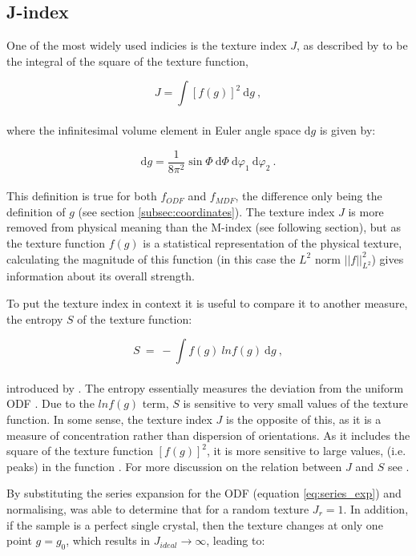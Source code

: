 \documentclass[a4paper,12pt,twoside]{report}
\numberwithin{equation}{chapter}
\begin{document}
\subsection{J-index} \label{subsec:j-index}
 One of the most widely used indicies is the texture index $J$, as described by \cite{bunge1982texture} to be the integral of the square of the texture function,

\begin{equation}
J = \int [ f(g) ]^2\ \mathrm{d}g \ ,
\end{equation} 
\\
where the infinitesimal volume element in Euler angle space $\mathrm{d}g$ is given by:

\begin{equation}
\mathrm{d}g = \frac{1}{8\pi^2} \sin\Phi\ \mathrm{d}\Phi\ \mathrm{d}\varphi_1\ \mathrm{d}\varphi_2\ .
\end{equation} 
\\
This definition is true for both $f_{ODF}$ and $f_{MDF}$, the difference only being the definition of $g$ (see section \ref{subsec:coordinates}). The texture index $J$ is more removed from physical meaning than the M-index (see following section), but as the texture function $f(g)$ is a statistical representation of the physical texture, calculating the magnitude of this function (in this case the $L^2$ norm $||f||^2_{L^2}$) gives information about its overall strength.

To put the texture index in context it is useful to compare it to another measure, the entropy $S$ of the texture function:

\begin{equation}
S\ =\ -\int f(g)\ ln f(g)\ \mathrm{d}g\ ,
\end{equation}
\\
introduced by \cite{Schaeben1988}. The entropy essentially measures the deviation from the uniform ODF \citep[lack of \lq{}organisation\rq{} of orientations,][]{Hielscher2007}. Due to the $ln f(g)$ term, $S$ is sensitive to very small values of the texture function. In some sense, the texture index $J$ is the opposite of this, as it is a measure of concentration rather than dispersion of orientations. As it includes the square of the texture function $[f(g)]^2$, it is more sensitive to large values, (i.e. peaks) in the function \citep{Mainprice}. For more discussion on the relation between $J$ and $S$ see \cite{Hielscher2007}. 

By substituting the series expansion for the ODF (equation \ref{eq:series_exp})  and normalising, \cite{bunge1982texture} was able to determine that for a random texture $J_r = 1$. In addition, if the sample is a perfect single crystal, then the texture changes at only one point $g = g_0$, which results in $J_{ideal} \to \infty$, leading to:
\end{document}
